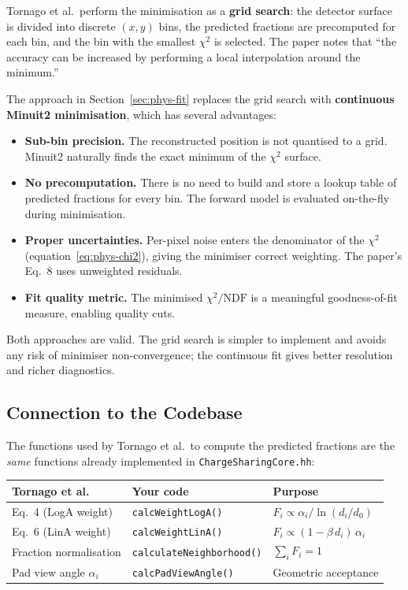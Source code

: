 \documentclass[11pt,a4paper]{article}
\newcommand{\code}[1]{\texttt{#1}}
\newcommand{\file}[1]{\texttt{#1}}
\begin{document}
Tornago et al.\ perform the minimisation as a \textbf{grid search}:
the detector surface is divided into discrete $(x, y)$ bins, the
predicted fractions are precomputed for each bin, and the bin with the
smallest $\chi^{2}$ is selected.  The paper notes that ``the accuracy
can be increased by performing a local interpolation around the
minimum.''

The approach in Section~\ref{sec:phys-fit} replaces the grid search
with \textbf{continuous Minuit2 minimisation}, which has several
advantages:

\begin{itemize}[nosep]
  \item \textbf{Sub-bin precision.}\quad
    The reconstructed position is not quantised to a grid.  Minuit2
    naturally finds the exact minimum of the $\chi^{2}$ surface.
  \item \textbf{No precomputation.}\quad
    There is no need to build and store a lookup table of predicted
    fractions for every bin.  The forward model is evaluated on-the-fly
    during minimisation.
  \item \textbf{Proper uncertainties.}\quad
    Per-pixel noise enters the denominator of the $\chi^{2}$
    (equation~\eqref{eq:phys-chi2}), giving the minimiser correct
    weighting.  The paper's Eq.~8 uses unweighted residuals.
  \item \textbf{Fit quality metric.}\quad
    The minimised $\chi^{2}/\text{NDF}$ is a meaningful goodness-of-fit
    measure, enabling quality cuts.
\end{itemize}

\noindent
Both approaches are valid.  The grid search is simpler to implement and
avoids any risk of minimiser non-convergence; the continuous fit gives
better resolution and richer diagnostics.

\subsection{Connection to the Codebase}

The functions used by Tornago et al.\ to compute the predicted fractions
are the \emph{same} functions already implemented in
\file{ChargeSharingCore.hh}:

\medskip
\begin{center}
\begin{tabular}{@{}lll@{}}
\toprule
\textbf{Tornago et al.} & \textbf{Your code} & \textbf{Purpose} \\
\midrule
Eq.~4 (LogA weight)
  & \code{calcWeightLogA()}
  & $F_i \propto \alpha_i / \ln(d_i/d_0)$ \\[2pt]
Eq.~6 (LinA weight)
  & \code{calcWeightLinA()}
  & $F_i \propto (1 - \beta\, d_i)\,\alpha_i$ \\[2pt]
Fraction normalisation
  & \code{calculateNeighborhood()}
  & $\sum_i F_i = 1$ \\[2pt]
Pad view angle $\alpha_i$
  & \code{calcPadViewAngle()}
  & Geometric acceptance \\
\bottomrule
\end{tabular}
\end{center}
\end{document}
